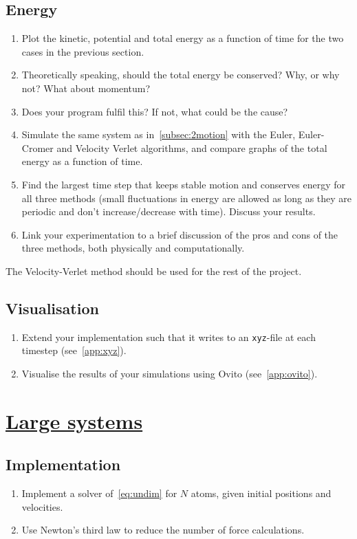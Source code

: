 \documentclass[11pt,english,a4paper]{report}
\begin{document}
\subsection{Energy}
\begin{enumerate}[label=\roman*.]
    \item Plot the kinetic, potential and total energy as a function of time for the two cases in the previous section.
    \item Theoretically speaking, should the total energy be conserved? Why, or why not? What about momentum?
    \item Does your program fulfil this? If not, what could be the cause?
    \item Simulate the same system as in~\vref{subsec:2motion} with the Euler, Euler-Cromer and Velocity Verlet algorithms, and compare graphs of the total energy as a function of time.
    \item Find the largest time step that keeps stable motion and conserves energy for all three methods (small fluctuations in energy are allowed as long as they are periodic and don't increase/decrease with time). Discuss your results.
    \item Link your experimentation to a brief discussion of the pros and cons of the three methods, both physically and computationally.
\end{enumerate}

The Velocity-Verlet method should be used for the rest of the project.

\subsection{Visualisation}
\begin{enumerate}[label=\roman*.]
    \item Extend your implementation such that it writes to an \texttt{xyz}-file at each timestep (see~\vref{app:xyz}).
    \item Visualise the results of your simulations using Ovito (see~\vref{app:ovito}).
\end{enumerate}


\section{\underline{Large systems}}

\subsection{Implementation}
\begin{enumerate}[label=\roman*.]
    \item Implement a solver of~\vref{eq:undim} for \(N\) atoms, given initial positions and velocities.
    \item Use Newton's third law to reduce the number of force calculations.
\end{enumerate}
\end{document}
